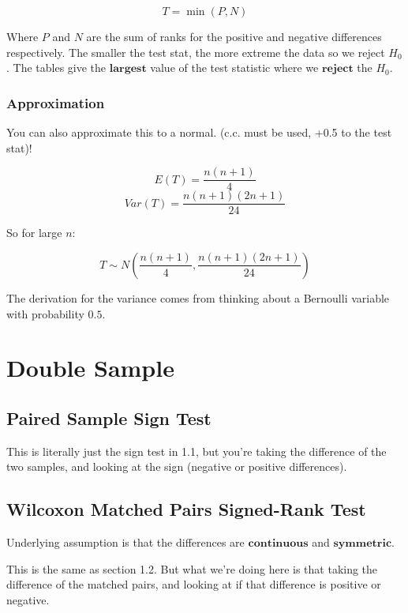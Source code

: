 \documentclass{article}
\theoremstyle{mytheoremstyle}
\theoremstyle{mytheoremstyle}
\theoremstyle{myproblemstyle}
\begin{document}
    \begin{definition}
        \[T = \min(P, N)\]
    \end{definition}

    Where $P$ and $N$ are the sum of ranks for the positive and negative differences respectively. The smaller the test stat, the more extreme the data so we reject $H_0$. The tables give the $\textbf{largest}$ value of the test statistic where we $\textbf{reject}$ the $H_0$.

    \subsubsection{Approximation}

    You can also approximate this to a normal. (c.c. must be used, +0.5 to the test stat)!

    \begin{theorem}
        \[E(T) = \frac{n(n+1)}{4}\]
        \[Var(T) = \frac{n(n+1)(2n+1)}{24}\]

        So for large $n$:

        \[T \sim N\left(\frac{n(n+1)}{4}, \frac{n(n+1)(2n+1)}{24}\right)\]
    \end{theorem}

    The derivation for the variance comes from thinking about a Bernoulli variable with probability $0.5$.

    \section{Double Sample}

    \subsection{Paired Sample Sign Test}
    This is literally just the sign test in 1.1, but you're taking the difference of the two samples, and looking at the sign (negative or positive differences).

    \subsection{Wilcoxon Matched Pairs Signed-Rank Test}
    Underlying assumption is that the differences are $\textbf{continuous}$ and $\textbf{symmetric}$.

    This is the same as section 1.2. But what we're doing here is that taking the difference of the matched pairs, and looking at if that difference is positive or negative.
\end{document}
